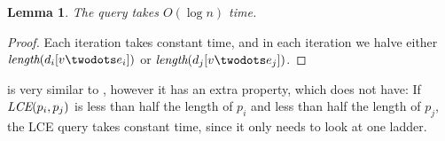 \documentclass[a4]{article}
\newtheorem{lemma}{Lemma}
\begin{document}
\begin{lemma}
The  query takes $O(\log n)$ time.
\end{lemma}
\begin{proof}
Each iteration takes constant time, and in each iteration we halve either $\zlength(d_i[v\twodots e_i])$ or $\zlength(d_j[v\twodots e_j])$.
\end{proof}

 is very similar to , however it has an extra property, which  does not have: If $\textit{LCE}(p_i,p_j)$ is less than half the length of $p_i$ and less than half the length of $p_j$, the LCE query takes constant time, since it only needs to look at one ladder.


\fi %

\end{document}
